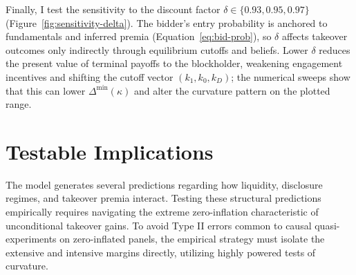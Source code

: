 \documentclass[11pt]{article}
\newcommand{\1}{\mathbf{1}}
\begin{document}
Finally, I test the sensitivity to the discount factor $\delta \in \{0.93, 0.95, 0.97\}$ (Figure~\ref{fig:sensitivity-delta}). The bidder's entry probability is anchored to fundamentals and inferred premia (Equation~\ref{eq:bid-prob}), so $\delta$ affects takeover outcomes only indirectly through equilibrium cutoffs and beliefs. Lower $\delta$ reduces the present value of terminal payoffs to the blockholder, weakening engagement incentives and shifting the cutoff vector $(k_1,k_0,k_D)$; the numerical sweeps show that this can lower $\Delta^{\min}(\kappa)$ and alter the curvature pattern on the plotted range.

\section{Testable Implications}
\label{sec:testable}
\label{sec:testable_implications}

The model generates several predictions regarding how liquidity, disclosure regimes, and takeover premia interact. Testing these structural predictions empirically requires navigating the extreme zero-inflation characteristic of unconditional takeover gains. To avoid Type II errors common to causal quasi-experiments on zero-inflated panels, the empirical strategy must isolate the extensive and intensive margins directly, utilizing highly powered tests of curvature.
\end{document}
